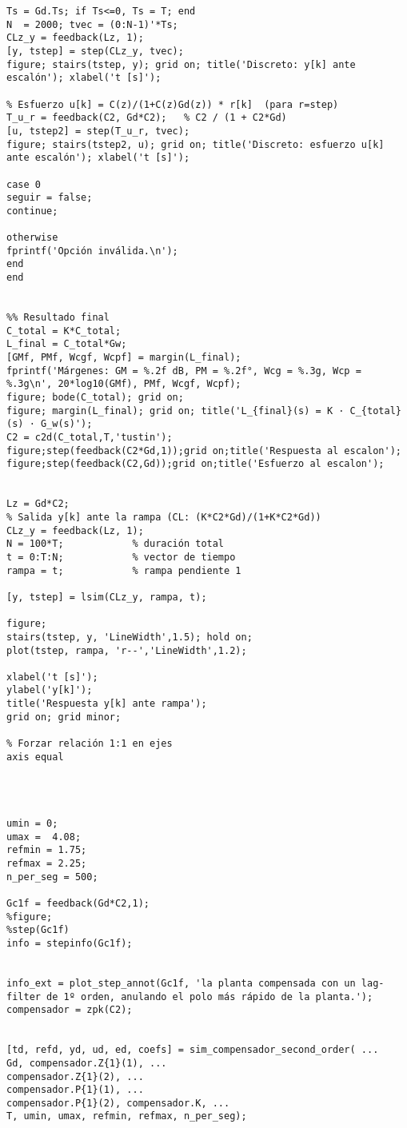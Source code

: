 \begin{lstlisting}[style=matlabstyle,caption={Hoja cálculos utilizada para el diseño de los compensadores.},label={matlab:hojaDeCalculos}]
% Respuesta al escalón (y[k])
Ts = Gd.Ts; if Ts<=0, Ts = T; end
N  = 2000; tvec = (0:N-1)'*Ts;
CLz_y = feedback(Lz, 1);
[y, tstep] = step(CLz_y, tvec);
figure; stairs(tstep, y); grid on; title('Discreto: y[k] ante escalón'); xlabel('t [s]');

% Esfuerzo u[k] = C(z)/(1+C(z)Gd(z)) * r[k]  (para r=step)
T_u_r = feedback(C2, Gd*C2);   % C2 / (1 + C2*Gd)
[u, tstep2] = step(T_u_r, tvec);
figure; stairs(tstep2, u); grid on; title('Discreto: esfuerzo u[k] ante escalón'); xlabel('t [s]');

case 0
seguir = false;
continue;

otherwise
fprintf('Opción inválida.\n');
end
end


%% Resultado final
C_total = K*C_total;
L_final = C_total*Gw;
[GMf, PMf, Wcgf, Wcpf] = margin(L_final);
fprintf('Márgenes: GM = %.2f dB, PM = %.2f°, Wcg = %.3g, Wcp = %.3g\n', 20*log10(GMf), PMf, Wcgf, Wcpf);
figure; bode(C_total); grid on;
figure; margin(L_final); grid on; title('L_{final}(s) = K · C_{total}(s) · G_w(s)');
C2 = c2d(C_total,T,'tustin');
figure;step(feedback(C2*Gd,1));grid on;title('Respuesta al escalon');
figure;step(feedback(C2,Gd));grid on;title('Esfuerzo al escalon');


Lz = Gd*C2;
% Salida y[k] ante la rampa (CL: (K*C2*Gd)/(1+K*C2*Gd))
CLz_y = feedback(Lz, 1);
N = 100*T;            % duración total
t = 0:T:N;            % vector de tiempo
rampa = t;            % rampa pendiente 1

[y, tstep] = lsim(CLz_y, rampa, t);

figure;
stairs(tstep, y, 'LineWidth',1.5); hold on;
plot(tstep, rampa, 'r--','LineWidth',1.2);

xlabel('t [s]');
ylabel('y[k]');
title('Respuesta y[k] ante rampa');
grid on; grid minor;

% Forzar relación 1:1 en ejes
axis equal




umin = 0;
umax =  4.08;
refmin = 1.75;
refmax = 2.25;
n_per_seg = 500;

Gc1f = feedback(Gd*C2,1);
%figure;
%step(Gc1f)
info = stepinfo(Gc1f);


info_ext = plot_step_annot(Gc1f, 'la planta compensada con un lag-filter de 1º orden, anulando el polo más rápido de la planta.');
compensador = zpk(C2);


[td, refd, yd, ud, ed, coefs] = sim_compensador_second_order( ...
Gd, compensador.Z{1}(1), ...
compensador.Z{1}(2), ...
compensador.P{1}(1), ...
compensador.P{1}(2), compensador.K, ...
T, umin, umax, refmin, refmax, n_per_seg);


\end{lstlisting}

